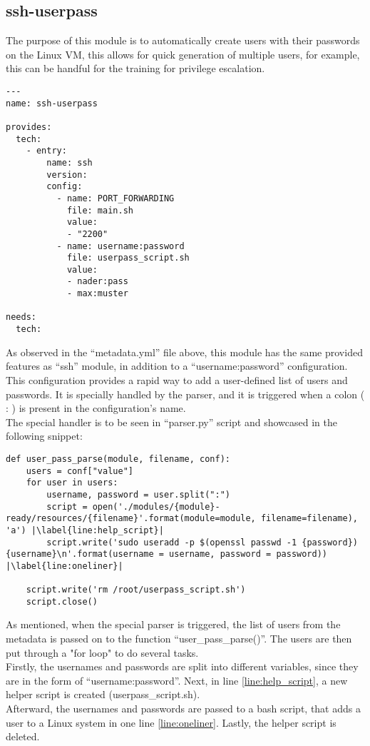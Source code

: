 \clearpage

\subsection{ssh-userpass}
The purpose of this module is to automatically create users with their passwords on the Linux VM, this allows for quick generation of multiple users, for example, this can be handful for the training for privilege escalation.

\begin{lstlisting}[caption=ssh-userpass metadata, style=pythonstyle]
---
name: ssh-userpass

provides:
  tech:
    - entry:
        name: ssh
        version:
        config:
          - name: PORT_FORWARDING
            file: main.sh
            value:
            - "2200"
          - name: username:password
            file: userpass_script.sh
            value:
            - nader:pass
            - max:muster

needs:
  tech:
\end{lstlisting}

As observed in the “metadata.yml” file above, this module has the same provided features as “ssh” module, in addition to a “username:password” configuration.\\
This configuration provides a rapid way to add a user-defined list of users and passwords. It is specially handled by the parser, and it is triggered when a colon ( : ) is present in the configuration’s name.\\
The special handler is to be seen in “parser.py” script and showcased in the following snippet:


\begin{lstlisting}[caption=ssh-userpass parsing, style=pythonstyle, escapechar=|]
def user_pass_parse(module, filename, conf):
    users = conf["value"]
    for user in users:
        username, password = user.split(":")
        script = open('./modules/{module}-ready/resources/{filename}'.format(module=module, filename=filename), 'a') |\label{line:help_script}|
        script.write('sudo useradd -p $(openssl passwd -1 {password}) {username}\n'.format(username = username, password = password)) |\label{line:oneliner}|

    script.write('rm /root/userpass_script.sh')
    script.close()
\end{lstlisting}

As mentioned, when the special parser is triggered, the list of users from the metadata is passed on to the function “user\_pass\_parse()”. The users are then put through a "for loop" to do several tasks.\\
Firstly, the usernames and passwords are split into different variables, since they are in the form of “username:password”. Next, in line \ref{line:help_script}, a new helper script is created (userpass\_script.sh).\\
Afterward, the usernames and passwords are passed to a bash script, that adds a user to a Linux system in one line \ref{line:oneliner}. Lastly, the helper script is deleted.\\

